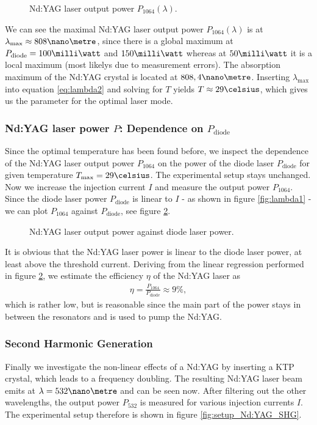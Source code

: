 \begin{figure}[p]
	\centering
	
	\caption{Nd:YAG laser output power $P_{1064}(\lambda)$.}
	\label{fig:lambda2}
\end{figure}

We can see the maximal Nd:YAG laser output power $P_{1064}(\lambda)$ is at $\lambda_\text{max}\approx 808\nano\metre$, since there is a global maximum at $P_\text{diode}=100\milli\watt$ and $150\milli\watt$ whereas at $50\milli\watt$ it is a local maximum (most likelys due to measurement errors).
The absorption maximum of the Nd:YAG crystal is located at $808,4\nano\metre$. Inserting $\lambda_\text{max}$ into equation \eqref{eq:lambda2} and solving for $T$ yields $T\approx 29\celsius$, which gives us the parameter for the optimal laser mode.
\subsubsection{Nd:YAG laser power $P$: Dependence on $P_\text{diode}$}
Since the optimal temperature has been found before, we inspect the dependence of the Nd:YAG laser output power $P_{1064}$ on the power of the diode laser $P_\text{diode}$ for given temperature $T_\text{max}=29\celsius$. The experimental setup stays unchanged. Now we increase the injection current $I$ and measure the output power $P_{1064}$. Since the diode laser power $P_\text{diode}$ is linear to $I$ - as shown in figure \ref{fig:lambda1} - we can plot $P_{1064}$ against $P_\text{diode}$, see figure \ref{fig:P1064}.

\begin{figure}[h]
	\centering
	
	\caption{Nd:YAG laser output power against diode laser power.}
	\label{fig:P1064}
\end{figure}

It is obvious that the Nd:YAG laser power is linear to the diode laser power, at least above the threshold current. Deriving from the linear regression performed in figure \ref{fig:P1064}, we estimate the efficiency $\eta$ of the Nd:YAG laser as
\begin{align}
\eta=\tfrac{P_{1064}}{P_\text{diode}}\approx 9\%,
\end{align}
which is rather low, but is reasonable since the main part of the power stays in between the resonators and is used to pump the Nd:YAG.

\subsubsection{Second Harmonic Generation}
Finally we investigate the non-linear effects of a Nd:YAG by inserting a KTP crystal, which leads to a frequency doubling. The resulting Nd:YAG laser beam emits at $\lambda=532\nano\metre$ and can be seen now. After filtering out the other wavelengths, the output power $P_{532}$ is measured for various injection currents $I$. The experimental setup therefore is shown in figure \ref{fig:setup_Nd:YAG_SHG}.

